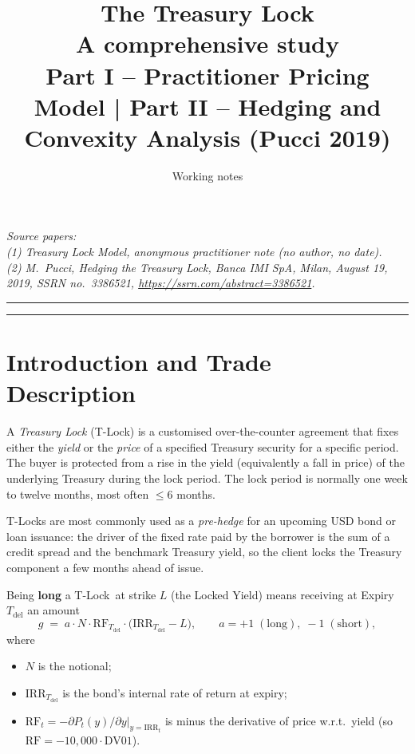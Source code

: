 \documentclass[11pt]{article}
\title{\textbf{The Treasury Lock}\\[4pt]
       \large A comprehensive study\\[2pt]
       \normalsize Part I -- Practitioner Pricing Model \quad|\quad
                  Part II -- Hedging and Convexity Analysis (Pucci 2019)}
\author{Working notes}
\date{}
\theoremstyle{definition}
\newcommand{\Tlock}{T-Lock}
\newcommand{\IRR}{\ensuremath{\mathrm{IRR}}}
\newcommand{\RF}{\ensuremath{\mathrm{RF}}}                 %
\newcommand{\Tdel}{T_{\mathrm{del}}}
\begin{document}
\maketitle
\vspace{-2.0em}

\begin{center}
\small\itshape
Source papers:\\
(1) \emph{Treasury Lock Model}, anonymous practitioner note (no author, no date).\\
(2) M.\ Pucci, \emph{Hedging the Treasury Lock}, Banca IMI SpA, Milan,
August 19, 2019, SSRN no.\ 3386521,
\url{https://ssrn.com/abstract=3386521}.
\end{center}

\hrule
\bigskip

\tableofcontents
\bigskip
\hrule

\section{Introduction and Trade Description}\label{sec:intro}

A \emph{Treasury Lock} (\Tlock) is a customised over-the-counter agreement
that fixes either the \emph{yield} or the \emph{price} of a specified
Treasury security for a specific period. The buyer is protected from a rise
in the yield (equivalently a fall in price) of the underlying Treasury
during the lock period. The lock period is normally one week to twelve
months, most often $\le 6$ months.

\Tlock s are most commonly used as a \emph{pre-hedge} for an upcoming USD
bond or loan issuance: the driver of the fixed rate paid by the borrower
is the sum of a credit spread and the benchmark Treasury yield, so the
client locks the Treasury component a few months ahead of issue.

Being \textbf{long} a \Tlock\ at strike $L$ (the Locked Yield) means
receiving at Expiry $\Tdel$ an amount
\begin{equation}
g \;=\; a \cdot N \cdot \RF_{\Tdel} \cdot \bigl( \IRR_{\Tdel} - L \bigr),
\qquad a = +1 \;(\text{long}),\; -1 \;(\text{short}),
\label{eq:payoff-pucci}
\end{equation}
where
\begin{itemize}[leftmargin=1.4em,itemsep=2pt,topsep=2pt]
\item $N$ is the notional;
\item $\IRR_{\Tdel}$ is the bond's internal rate of return at expiry;
\item $\RF_t = -\partial P_t(y)/\partial y\big|_{y=\IRR_t}$ is minus the
      derivative of price w.r.t.\ yield (so $\RF = -10{,}000\cdot\text{DV01}$).
\end{itemize}
\end{document}
